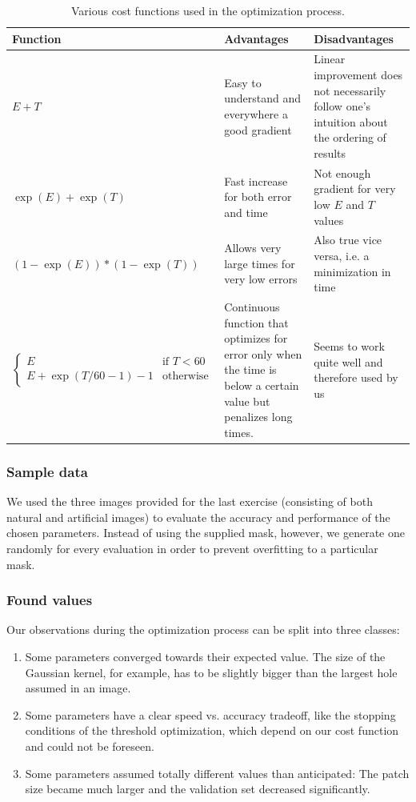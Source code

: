 \documentclass[10pt,conference,compsocconf]{IEEEtran}
\begin{document}
\begin{table}
\centering
\begin{tabular}{|l|p{6cm}|p{6cm}|}
\hline
Function & Advantages & Disadvantages \\
\hline
$E + T$ & Easy to understand and everywhere a good gradient & Linear improvement does not necessarily follow one's intuition about the ordering of results \\
\hline
$\exp(E)+\exp(T)$ & Fast increase for both error and time & Not enough gradient for very low $E$ and $T$ values \\
\hline
$(1-\exp(E))*(1-\exp(T))$ & Allows very large times for very low errors & Also true vice versa, i.e. a minimization in time \\
\hline
$\begin{cases}
E & \text{if }T<60\\
E+\exp(T/60 - 1) - 1 & \text{otherwise}
\end{cases}$ & Continuous function that optimizes for error only when the time is below a certain value but penalizes long times. & Seems to work quite well and therefore used by us \\
\hline
\end{tabular}
\caption{Various cost functions used in the optimization process.}
\label{error_functions}
\end{table}

\subsubsection{Sample data}
We used the three images provided for the last exercise (consisting of both natural and artificial images) to evaluate the accuracy and performance of the chosen parameters. Instead of using the supplied mask, however, we generate one randomly for every evaluation in order to prevent overfitting to a particular mask. 

\subsubsection{Found values}
Our observations during the optimization process can be split into three classes:
\begin{enumerate}
\item Some parameters converged towards their expected value. The size of the Gaussian kernel, for example, has to be slightly bigger than the largest hole assumed in an image.
\item Some parameters have a clear speed vs. accuracy tradeoff, like the stopping conditions of the threshold optimization, which depend on our cost function and could not be foreseen.
\item Some parameters assumed totally different values than anticipated: The patch size became much larger and the validation set decreased significantly.
\end{enumerate}
\end{document}
